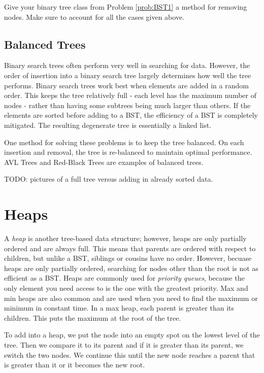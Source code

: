 \begin{problem}
Give your binary tree class from Problem \ref{prob:BST1} a method for removing nodes. 
Make sure  to account for all the cases given above.
\label{prob:BST2}
\end{problem}

\subsection*{Balanced Trees}
Binary search trees often perform very well in searching for data.
However, the order of insertion into a binary search tree largely determines how well the tree performs.
Binary search trees work best when elements are added in a random order.
This keeps the tree relatively full - each level has the maximum number of nodes -  rather than having some subtrees being much larger than others.
If the elements are sorted before adding to a BST, the efficiency of a BST is completely mitigated.
The resulting degenerate tree is essentially a linked list.

One method for solving these problems is to keep the tree balanced.
On each insertion and removal, the tree is re-balanced to maintain optimal performance.
AVL Trees and Red-Black Trees are examples of balanced trees.

TODO: pictures of a full tree versus adding in already sorted data.

\section*{Heaps}

A \emph{heap} is another tree-based data structure; however, heaps are only partially ordered and are always full.
This means that parents are ordered with respect to children, but unlike a BST, siblings or cousins have no order. 
However, becuase heaps are only partially ordered, searching for nodes other than the root is not as efficient as a BST.
Heaps are commonly used for \emph{priority queues}, because the only element you need access to is the one with the greatest priority.
Max and min heaps are also common and are used when you need to find the maximum or minimum in constant time.
In a max heap, each parent is greater than its children.
This puts the maximum at the root of the tree.


To add into a heap, we put the node into an empty spot on the lowest level of the tree.
Then we compare it to its parent and if it is greater than its parent, we switch the two nodes.
We continue this until the new node reaches a parent that is greater than it or it becomes the new root.

